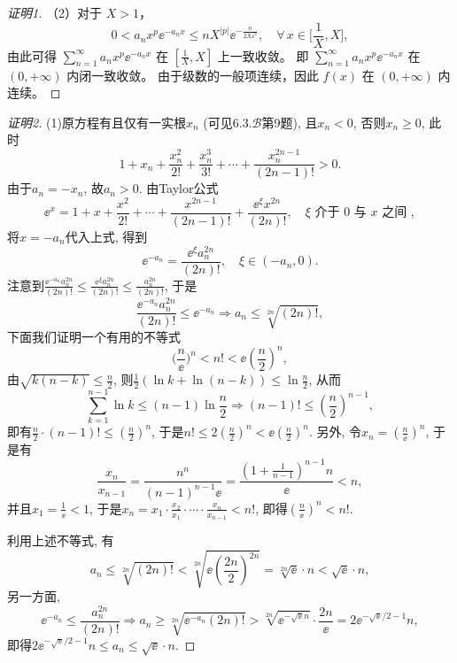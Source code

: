 \begin{quizb}
\begin{enumerate}
\begin{proof}[证明1]
（2）对于 $X>1$，
$$0<a_{n} x^{p} \ee^{-a_{n}x} \leqslant n X^{|p|} \ee^{-\frac{n}{2X\ee^{2}}}, 
\quad \forall\, x \in\Big[\frac{1}{X}, X\Big],$$
由此可得 \(\sum_{n=1}^{\infty} a_{n} x^{p} \ee^{-a_{n}x}\) 在 $\left[\frac{1}{X}, X\right]$ 上一致收敛。
即 \(\sum_{n=1}^{\infty} a_{n} x^{p} \ee^{-a_{n}x}\) 在 $(0,+\infty)$ 内闭一致收敛。
由于级数的一般项连续，因此 $f(x)$ 在 $(0,+\infty)$ 内连续。
\end{proof}
\begin{proof}[证明2]
(1)原方程有且仅有一实根\(x_n\) (可见6.3.\(\boldsymbol{\mathcal{B}}\)第9题), 
且\(x_n<0\), 否则\(x_n\geqslant 0\), 此时
\[1+x_n+\frac{x_n^2}{2!}+\frac{x_n^3}{3!}+\cdots+\frac{x_n^{2n-1}}{(2n-1)!}>0.\]
由于\(a_n=-x_n\), 故\(a_n>0\). 由Taylor公式
\[\ee^{x}=1+x+\frac{x^2}{2!}+\cdots+\frac{x^{2n-1}}{(2n-1)!}
+\frac{\ee^{\xi}x^{2n}}{(2n)!},\quad \xi\text{ 介于 }0\text{ 与 }x\text{ 之间 },\]
将\(x=-a_n\)代入上式, 得到
\[\ee^{-a_n}=\frac{\ee^{\xi}a_n^{2n}}{(2n)!},\quad\xi\in(-a_n,0).\]
注意到\(\frac{\ee^{-a_n}a_n^{2n}}{(2n)!}
\leqslant\frac{\ee^{\xi}a_n^{2n}}{(2n)!}\leqslant\frac{a_n^{2n}}{(2n)!}\), 
于是\[\frac{\ee^{-a_n}a_n^{2n}}{(2n)!}
\leqslant\ee^{-a_n}\Rightarrow a_n\leqslant\sqrt[2n]{(2n)!},\]
下面我们证明一个有用的不等式
\[\Big(\frac{n}{\ee}\Big)^n<n!<\ee\left(\frac{n}{2}\right)^n,\]
由\(\sqrt{k(n-k)}\leqslant\frac{n}{2}\), 
则\(\frac{1}{2}\left(\ln k+\ln(n-k)\right)\leqslant\ln\frac{n}{2}\), 从而
\[\sum_{k=1}^{n-1}\ln k\leqslant(n-1)\ln\frac{n}{2}\Rightarrow (n-1)!
\leqslant\left(\frac{n}{2}\right)^{n-1},\]
即有\(\frac{n}{2}\cdot (n-1)!\leqslant\left(\frac{n}{2}\right)^n\), 
于是\(n!\leqslant 2\left(\frac{n}{2}\right)^n<\ee\left(\frac{n}{2}\right)^n\). 
另外, 令\(x_n=\left(\frac{n}{\ee}\right)^n\), 于是有
\[\frac{x_n}{x_{n-1}}=\frac{n^n}{(n-1)^{n-1}\ee}
=\frac{\left(1+\frac{1}{n-1}\right)^{n-1}n}{\ee}<n,\]
并且\(x_1=\frac{1}{\ee}<1\), 于是\(x_n=x_1\cdot\frac{x_2}{x_1}\cdot\cdots\cdot\frac{x_n}{x_{n-1}}<n!\), 即得\(\left(\frac{n}{\ee}\right)^n<n!\).

利用上述不等式, 有\[a_n\leqslant\sqrt[2n]{(2n)!}<\sqrt[2n]{\ee\left(\frac{2n}{2}\right)^{2n}}=\sqrt[2n]{\ee}\cdot n<\sqrt{\ee}\cdot n,\]
另一方面,\[\ee^{-a_n}\leqslant\frac{a_n^{2n}}{(2n)!}\Rightarrow 
a_n\geqslant\sqrt[2n]{\ee^{-a_n}(2n)!}>\sqrt[2n]{\ee^{-\sqrt{\ee} n}}\cdot \frac{2n}{\ee}=2\ee^{-\sqrt{\ee}/2-1}n,\]
即得\(2\ee^{-\sqrt{\ee}/2-1}n\leqslant a_n\leqslant\sqrt{\ee}\cdot n.\)
\end{proof}
\end{enumerate}
\end{quizb}

